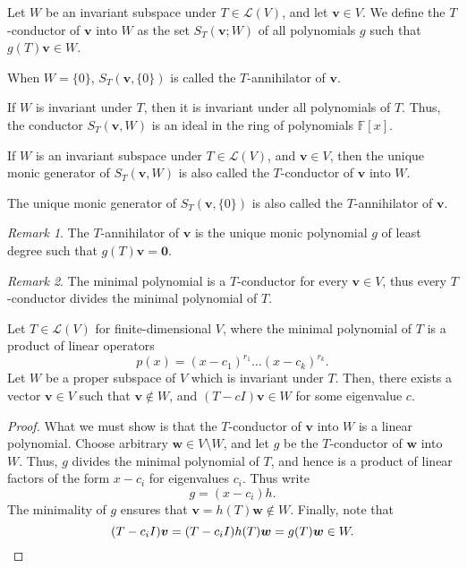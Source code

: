 \documentclass[11pt]{article}
\newcommand{\F}{\mathbb{F}}
\renewcommand{\vec}[1]{\boldsymbol{#1}}
\newcommand{\vv}{\vec{v}}
\newcommand{\vw}{\vec{w}}
\newcommand{\alg}[1]{\mathscr{#1}}
\newcommand{\algL}{\alg{L}}
\theoremstyle{definition}
\theoremstyle{remark}
\newtheorem*{remark}{Remark}
\numberwithin{equation}{section}
\begin{document}
    \begin{definition}
        Let $W$ be an invariant subspace under $T \in \algL(V)$, and let $\vv \in V$.
        We define the $T$-conductor of $\vv$ into $W$ as the set $S_T(\vv; W)$ of all
        polynomials $g$ such that $g(T)\vv \in W$.

        When $W = \{0\}$, $S_T(\vv, \{0\})$ is called the $T$-annihilator of
        $\vv$.
    \end{definition}

    \begin{lemma}
        If $W$ is invariant under $T$, then it is invariant under all polynomials of
        $T$. Thus, the conductor $S_T(\vv, W)$ is an ideal in the ring of polynomials
        $\F[x]$.
    \end{lemma}

    \begin{definition}
        If $W$ is an invariant subspace under $T \in \algL(V)$, and $\vv \in V$, then
        the unique monic generator of $S_T(\vv, W)$ is also called the $T$-conductor
        of $\vv$ into $W$.

        The unique monic generator of $S_T(\vv, \{0\})$ is also called the
        $T$-annihilator of $\vv$.
        \begin{remark}
            The $T$-annihilator of $\vv$ is the unique monic polynomial $g$ of least
            degree such that $g(T)\vv = \vec{0}$.
        \end{remark}
        \begin{remark}
            The minimal polynomial is a $T$-conductor for every $\vv \in V$, thus
            every $T$-conductor divides the minimal polynomial of $T$.
        \end{remark}
    \end{definition}

    \begin{lemma} \label{lemma:tri_span}
        Let $T \in \alg{L}(V)$ for finite-dimensional $V$, where the minimal
        polynomial of $T$ is a product of linear operators \[
            p(x) = (x - c_1)^{r_1} \dots (x - c_k)^{r_k}.
        \] Let $W$ be a proper subspace of $V$ which is invariant under $T$. Then,
        there exists a vector $\vv \in V$ such that $\vv \notin W$, and $(T - cI)\vv
        \in W$ for some eigenvalue $c$.
    \end{lemma}
    \begin{proof}
        What we must show is that the $T$-conductor of $\vv$ into $W$ is a linear
        polynomial. Choose arbitrary $\vw \in V\setminus W$, and let $g$ be the
        $T$-conductor of $\vw$ into $W$. Thus, $g$ divides the minimal polynomial of
        $T$, and hence is a product of linear factors of the form $x - c_i$ for
        eigenvalues $c_i$. Thus write \[
            g = (x - c_i)h.
        \] The minimality of $g$ ensures that $\vv = h(T)\vw \notin W$. Finally, note
        that \[
            (T - c_iI)\vv = (T - c_iI)h(T)\vw = g(T)\vw \in W. \qedhere
        \] 
    \end{proof}
\end{document}

